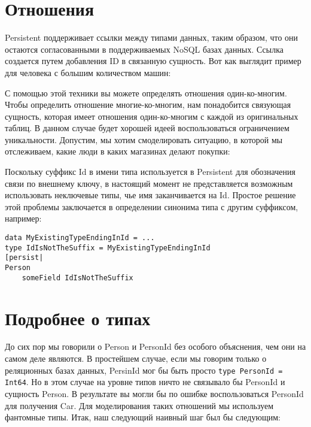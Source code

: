 \section{Отношения} %

Persistent поддерживает ссылки между типами данных, таким образом, что они остаются согласованными в поддерживаемых NoSQL базах данных. Ссылка создается путем добавления ID в связанную сущность. Вот как выглядит пример для человека с большим количеством машин:


С помощью этой техники вы можете определять отношения один-ко-многим. Чтобы определить отношение многие-ко-многим, нам понадобится связующая сущность, которая имеет отношения один-ко-многим с каждой из оригинальных таблиц. В данном случае будет хорошей идеей воспользоваться ограничением уникальности. Допустим, мы хотим смоделировать ситуацию, в которой мы отслеживаем, какие люди в каких магазинах делают покупки:


\begin{remark}
Поскольку суффикс Id в имени типа используется в Persistent для обозначения связи по внешнему ключу, в настоящий момент не представляется возможным использовать неключевые типы, чье имя заканчивается на Id. Простое решение этой проблемы заключается в определении синонима типа с другим суффиксом, например:

\begin{lstlisting}
data MyExistingTypeEndingInId = ...
type IdIsNotTheSuffix = MyExistingTypeEndingInId
[persist|
Person
    someField IdIsNotTheSuffix
\end{lstlisting}%
\end{remark}

\section{Подробнее о типах} %

До сих пор мы говорили о Person и PersonId без особого объяснения, чем они на самом деле являются. В простейшем случае, если мы говорим только о реляционных базах данных, PersinId мог бы быть просто \lstinline'type PersonId = Int64'. Но в этом случае на уровне типов ничто не связывало бы PersonId и сущность Person. В результате вы могли бы по ошибке воспользоваться PersonId для получения Car. Для моделирования таких отношений мы используем фантомные типы. Итак, наш следующий наивный шаг был бы следующим:

